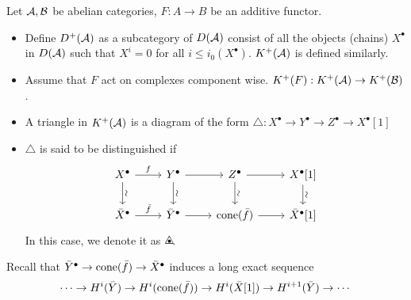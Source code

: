 \begin{definition}
  Let $\mathcal{A}, \mathcal{B}$ be abelian categories, $F: A \to B$ be an additive functor.
  \begin{itemize}
    \item Define $D^+(\mathcal{A})$ as a subcategory of $D(\mathcal{A})$
      consist of all the objects (chains) $X^\bullet$ in $D(\mathcal{A})$
      such that $X^i = 0$ for all $i \leq i_0(X^\bullet)$.
      $K^+(\mathcal{A})$ is defined similarly.
    \item Assume that $F$ act on complexes component wise.
      $K^+(F) : K^+(\mathcal{A}) \to K^+(\mathcal{B})$.
    \item A triangle in $K^+(\mathcal{A})$ is a diagram of the form
      $\triangle: X^\bullet \to Y^\bullet \to Z^\bullet \to X^\bullet[1]$
    \item $\triangle$ is said to be distinguished if
      \[ \begin{tikzcd}
          X^\bullet \ar[r, "f"] \ar[d, "\rotatebox{90}{\(\sim\)}"] &
          Y^\bullet \ar[r] \ar[d, "\rotatebox{90}{\(\sim\)}"] &
          Z^\bullet \ar[r] \ar[d, "\rotatebox{90}{\(\sim\)}"] &
          X^\bullet[1] \ar[d, "\rotatebox{90}{\(\sim\)}"] \\
          \bar{X}^\bullet \ar[r, "\bar{f}"] &
          \bar{Y}^\bullet \ar[r] &
          \cone(\bar{f}) \ar[r] &
          \bar{X}^\bullet[1]
      \end{tikzcd} \]
    In this case, we denote it as $\tridot$.
  \end{itemize}
\end{definition}

Recall that $\bar{Y}^\bullet \to \operatorname{cone}(\bar{f}) \to \bar{X}^\bullet$
induces a long exact sequence
\[ \cdots \to H^i(\bar{Y}) \to H^i(\operatorname{cone}(\bar{f}))
  \to H^i(\bar{X}[1]) \to H^{i+1}(\bar{Y}) \to \cdots \]

